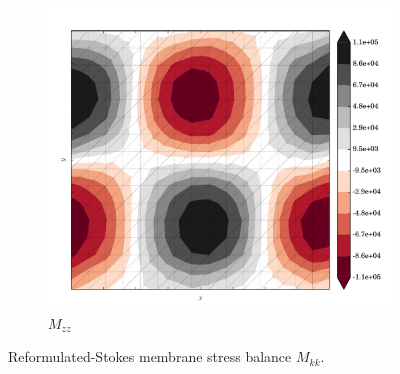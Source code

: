 \begin{figure}
  \begin{subfigure}[b]{0.3\linewidth}
    \includegraphics[width=\linewidth]{images/stress_balance/RS/M_zz.pdf}
  \caption{$M_{zz}$}
  \label{rs_M_zz}
  \end{subfigure}
 
  \caption[ISMIP-HOM reformulated-Stokes membrane stress balance]{Reformulated-Stokes membrane stress balance $M_{kk}$.}

  \label{rs_membrane_stress_balance}

\end{figure}


